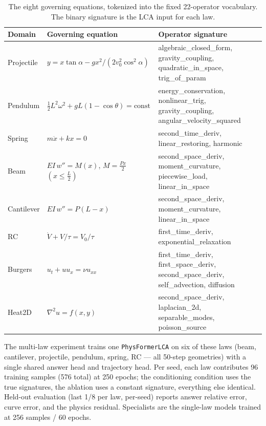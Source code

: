 \documentclass[11pt,a4paper]{article}
\begin{document}
\begin{table}[h]
\centering
\small
\caption{The eight governing equations, tokenized into the fixed 22-operator
vocabulary. The binary signature is the LCA input for each law.}
\label{tab:laws}
\begin{tabular}{@{}lll@{}}
\toprule
Domain & Governing equation & Operator signature \\
\midrule
Projectile & $y = x\tan\alpha - gx^2/(2v_0^2\cos^2\alpha)$ &
  algebraic\_closed\_form, gravity\_coupling, quadratic\_in\_space, trig\_of\_param \\
Pendulum & $\tfrac{1}{2}L^2\omega^2 + gL(1-\cos\theta)=\mathrm{const}$ &
  energy\_conservation, nonlinear\_trig, gravity\_coupling, angular\_velocity\_squared \\
Spring & $m\ddot{x} + kx = 0$ &
  second\_time\_deriv, linear\_restoring, harmonic \\
Beam & $EI\,w'' = M(x)$, $M=\tfrac{Px}{2}$ $(x\le\tfrac{L}{2})$ &
  second\_space\_deriv, moment\_curvature, piecewise\_load, linear\_in\_space \\
Cantilever & $EI\,w'' = P(L-x)$ &
  second\_space\_deriv, moment\_curvature, linear\_in\_space \\
RC & $\dot{V} + V/\tau = V_0/\tau$ &
  first\_time\_deriv, exponential\_relaxation \\
Burgers & $u_t + uu_x = \nu u_{xx}$ &
  first\_time\_deriv, first\_space\_deriv, second\_space\_deriv, self\_advection, diffusion \\
Heat2D & $\nabla^2 u = f(x,y)$ &
  second\_space\_deriv, laplacian\_2d, separable\_modes, poisson\_source \\
\bottomrule
\end{tabular}
\end{table}

The multi-law experiment trains one \texttt{PhysFormerLCA} on six of these
laws (beam, cantilever, projectile, pendulum, spring, RC --- all 50-step
geometries) with a single shared answer head and trajectory head. Per
seed, each law contributes 96 training samples (576 total) at 250 epochs;
the conditioning condition uses the true signatures, the ablation uses a
constant signature, everything else identical. Held-out evaluation (last
1/8 per law, per-seed) reports answer relative error, curve error, and the
physics residual. Specialists are the single-law models trained at 256
samples / 60 epochs.
\end{document}
